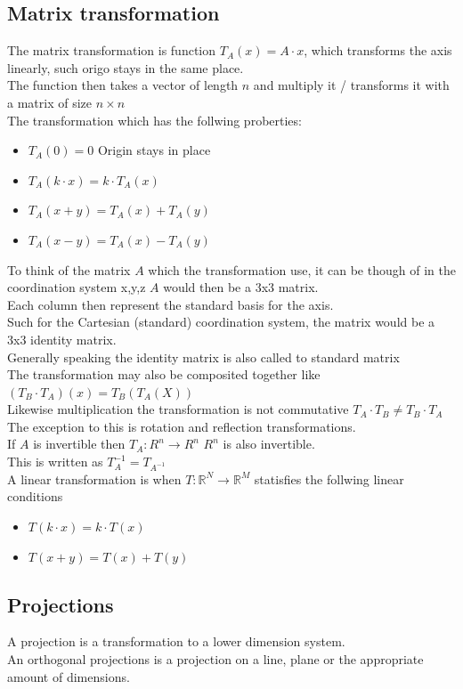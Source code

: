 \documentclass[12pt, a4paper]{article}
\begin{document}
		\subsection{Matrix transformation}
			The matrix transformation is function $T_A(x)=A\cdot x$, which transforms the axis linearly, such origo stays in the same place.\\
			The function then takes a vector of length $n$ and multiply it / transforms it with a matrix of size $n\times n$\\
			The transformation which has the follwing proberties:
			\begin{itemize}
				\item $T_A(0)=0$ Origin stays in place
				\item $T_A(k\cdot x) = k\cdot T_A(x)$ 
				\item $T_A(x+y)=T_A(x)+T_A(y)$
				\item $T_A(x-y)=T_A(x)-T_A(y)$
			\end{itemize}
			To think of the matrix $A$ which the transformation use, it can be though of in the coordination system x,y,z $A$ would then be a 3x3 matrix.\\
			Each column then represent the standard basis for the axis. \\
			Such for the Cartesian (standard) coordination system, the matrix would be a 3x3 identity matrix.\\
			Generally speaking the identity matrix is also called to standard matrix\\[4mm]
			The transformation may also be composited together like $(T_B\cdot T_A)(x)=T_B(T_A(X))$\\
			Likewise multiplication the transformation is not commutative $T_A\cdot T_B\neq T_B \cdot T_A$\\
			The exception to this is rotation and reflection transformations.\\
			If $A$ is invertible then $T_A:R^n\rightarrow R^n$ $R^n$ is also invertible.\\
			This is written as $T_A^{-1}=T_{A^{-1}}$\\
			A linear transformation is when $T:\mathbb{R}^N\rightarrow\mathbb{R}^M$ statisfies the follwing linear conditions
			\begin{itemize}
				\item $T(k\cdot x) = k\cdot T(x)$
				\item $T(x+y)=T(x)+T(y)$
			\end{itemize}
		\subsection{Projections}
			A projection is a transformation to a lower dimension system.\\
			An orthogonal projections is a projection on a line, plane or the appropriate amount of dimensions.\\
\end{document}
